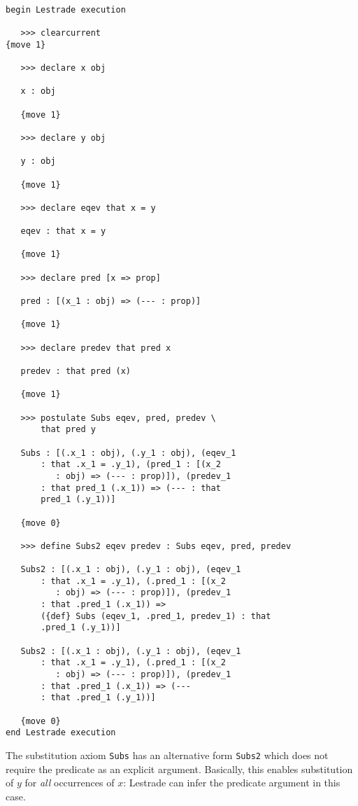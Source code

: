 \documentclass[12pt]{article}
\begin{document}
\begin{verbatim}

begin Lestrade execution

   >>> clearcurrent
{move 1}

   >>> declare x obj

   x : obj

   {move 1}

   >>> declare y obj

   y : obj

   {move 1}

   >>> declare eqev that x = y

   eqev : that x = y

   {move 1}

   >>> declare pred [x => prop]

   pred : [(x_1 : obj) => (--- : prop)]

   {move 1}

   >>> declare predev that pred x

   predev : that pred (x)

   {move 1}

   >>> postulate Subs eqev, pred, predev \
       that pred y

   Subs : [(.x_1 : obj), (.y_1 : obj), (eqev_1 
       : that .x_1 = .y_1), (pred_1 : [(x_2 
          : obj) => (--- : prop)]), (predev_1 
       : that pred_1 (.x_1)) => (--- : that 
       pred_1 (.y_1))]

   {move 0}

   >>> define Subs2 eqev predev : Subs eqev, pred, predev

   Subs2 : [(.x_1 : obj), (.y_1 : obj), (eqev_1 
       : that .x_1 = .y_1), (.pred_1 : [(x_2 
          : obj) => (--- : prop)]), (predev_1 
       : that .pred_1 (.x_1)) => 
       ({def} Subs (eqev_1, .pred_1, predev_1) : that 
       .pred_1 (.y_1))]

   Subs2 : [(.x_1 : obj), (.y_1 : obj), (eqev_1 
       : that .x_1 = .y_1), (.pred_1 : [(x_2 
          : obj) => (--- : prop)]), (predev_1 
       : that .pred_1 (.x_1)) => (--- 
       : that .pred_1 (.y_1))]

   {move 0}
end Lestrade execution

\end{verbatim}

The substitution axiom {\tt Subs} has an alternative form {\tt Subs2} which does not require the predicate as an explicit argument.
Basically, this enables substitution of $y$ for {\em all\/} occurrences of $x$:  Lestrade can infer the predicate argument in this case.
\end{document}
